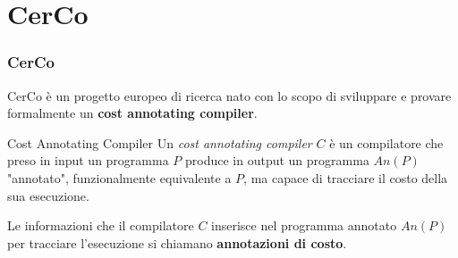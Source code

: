 \documentclass{beamer}
\begin{document}
\section{CerCo}
\begin{frame}
    \frametitle{CerCo}
    CerCo \`{e} un progetto europeo di ricerca nato con lo scopo di sviluppare e provare formalmente un \textbf{cost annotating compiler}.
    \begin{block}{Cost Annotating Compiler}
    Un \textit{cost annotating compiler} $C$ \`{e} un compilatore che preso in input un programma $P$ produce in output un programma $An(P)$ "annotato", funzionalmente equivalente a $P$, ma capace di tracciare il costo della sua esecuzione.\\
    \end{block}
    Le informazioni che il compilatore $C$ inserisce nel programma annotato $An(P)$ per tracciare l'esecuzione si chiamano \textbf{annotazioni di costo}.
\end{frame}
\end{document}
